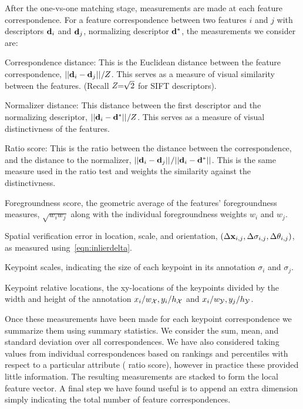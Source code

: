 After the one-vs-one matching stage, measurements are made at each feature correspondence.
For a feature correspondence between two features $i$ and $j$ with descriptors $\mathbf{d}_i$ and $\mathbf{d}_j$,
  normalizing descriptor $\mathbf{d}^{*}$, the measurements we consider are:

\begin{itemln}

    \item Correspondence distance:
    This is the Euclidean distance between the feature correspondence, $||\mathbf{d}_i - \mathbf{d}_j||_{} / Z$.
    This serves as a measure of visual similarity between the features.
    (Recall $Z\mkern-6mu=\mkern-6mu\sqrt{2}$ for SIFT descriptors).

    \item Normalizer distance:
    This distance between the first descriptor and the normalizing descriptor, %
        $||\mathbf{d}_i - \mathbf{d}^{*}||_{} / Z$.
        This serves as a measure of visual distinctivness of the features.

    \item Ratio score:
    This is the ratio between the distance between the correspondence, and the distance to the normalizer, %
        $||\mathbf{d}_i - \mathbf{d}_j||_{} / ||\mathbf{d}_i - \mathbf{d}^{*}||_{}$.
        This is the same measure used in the ratio test and weights the similarity against the distinctivness.

    \item Foregroundness score, the geometric average of the features' foregroundness measures, $\sqrt{w_i w_j}$
      along with the individual foregroundness weights $w_i$ and $w_j$.
        
    \item Spatial verification error in location, scale, and orientation, $( %
        \Delta \pt_{i, j}, %
        \Delta \scale_{i, j}, %
        \Delta \ori_{i, j})$, as measured using~\cref{eqn:inlierdelta}.

    \item Keypoint scales, indicating the size of each keypoint in its annotation $\sigma_i$ and $\sigma_j$.

    \item Keypoint relative locations, the xy-locations of the keypoints divided by the width and height of the
      annotation $x_i / w_{\mathcal{X}}, y_i / h_{\mathcal{X}}$ and $x_i / w_{\mathcal{Y}}, y_j / h_{\mathcal{Y}}$.
\end{itemln}

Once these measurements have been made for each keypoint correspondence we summarize them using summary
  statistics.
We consider the sum, mean, and standard deviation over all correspondences.
We have also considered taking values from individual correspondences based on rankings and percentiles with
  respect to a particular attribute (\eg{} ratio score), however in practice these provided little information.
The resulting measurements are stacked to form the local feature vector.
A final step we have found useful is to append an extra dimension simply indicating the total number of feature
  correspondences.

